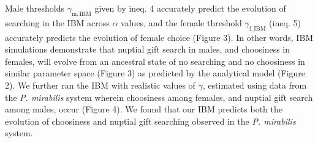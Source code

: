 \documentclass[
]{article}
\begin{document}
Male thresholds \(\gamma_{\mathrm{m, IBM}}\) given by ineq. 4 accurately
predict the evolution of searching in the IBM across \(\alpha\) values,
and the female threshold \(\gamma_{\mathrm{f, IBM}}\) (ineq. 5)
accurately predicts the evolution of female choice (Figure 3). In other
words, IBM simulations demonstrate that nuptial gift search in males,
and choosiness in females, will evolve from an ancestral state of no
searching and no choosiness in similar parameter space (Figure 3) as
predicted by the analytical model (Figure 2). We further ran the IBM
with realistic values of \(\gamma\), estimated using data from the
\emph{P. mirabilis} system wherein choosiness among females, and nuptial
gift search among males, occur (Figure 4). We found that our IBM
predicts both the evolution of choosiness and nuptial gift searching
observed in the \emph{P. mirabilis} system.
\end{document}
